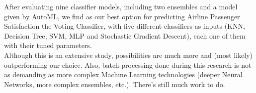 After evaluating nine classifier models, including two ensembles and a model given by AutoML,
we find as our best option for predicting Airline Passenger Satisfaction the Voting Classifier,
with five different classifiers as inputs (KNN, Decision Tree, SVM, MLP and Stochastic Gradient Descent),
each one of them with their tuned parameters.\\
Although this is an extensive study, possibilities are much more and (most likely) outperforming our choice.
Also, batch-processing done during this research is not as demanding as more complex Machine Learning technologies
(deeper Neural Networks, more complex ensembles, etc.). There's still much work to do.
